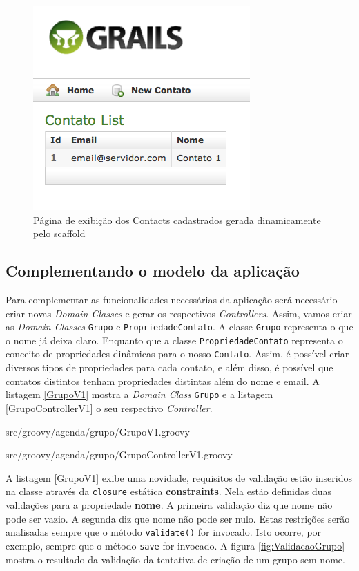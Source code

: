 \documentclass[12pt]{article}
\begin{document}
   \begin{figure}[h!]
      \centering
      \includegraphics[width=.3\textwidth]{images/listContactScaffold.png}
      \caption{Página de exibição dos Contacts cadastrados gerada dinamicamente pelo scaffold}
      \label{fig:listContactScaffold}
  \end{figure}
  
\subsection{Complementando o modelo da aplicação}

  Para complementar as funcionalidades necessárias da aplicação será necessário 
  criar novas \emph{Domain Classes} e gerar os respectivos \emph{Controllers}. 
  Assim, vamos criar as \emph{Domain Classes} \texttt{Grupo} e \texttt{PropriedadeContato}.
  A classe \texttt{Grupo} representa o que o nome já deixa claro. Enquanto que a classe
  \texttt{PropriedadeContato} representa o conceito de propriedades dinâmicas para
  o nosso \texttt{Contato}. Assim, é possível criar diversos tipos de propriedades 
  para cada contato, e além disso, é possível que contatos distintos te\-nham propriedades
  distintas além do nome e email. A listagem \ref{GrupoV1} mostra a \emph{Domain Class}
  \texttt{Grupo} e a listagem \ref{GrupoControllerV1} o seu respectivo \emph{Controller}. 
  
  
                  {src/groovy/agenda/grupo/GrupoV1.groovy}
 
  
                  {src/groovy/agenda/grupo/GrupoControllerV1.groovy}
 
  A listagem \ref{GrupoV1} exibe uma novidade, requisitos de validação estão inseridos
  na classe através da \texttt{closure} estática \textbf{constraints}.
  Nela estão definidas duas validações para a propriedade \textbf{nome}. A primeira
  validação diz que nome não pode ser vazio. A segunda diz que nome não pode ser
  nulo. Estas restrições serão analisadas sempre que o método \texttt{validate()} 
  for invocado. Isto ocorre, por exemplo, sempre que o método \texttt{save} for 
  invocado. A figura \ref{fig:ValidacaoGrupo} mostra o resultado da validação da 
  tentativa de criação de um grupo sem nome.
  
\end{document}
